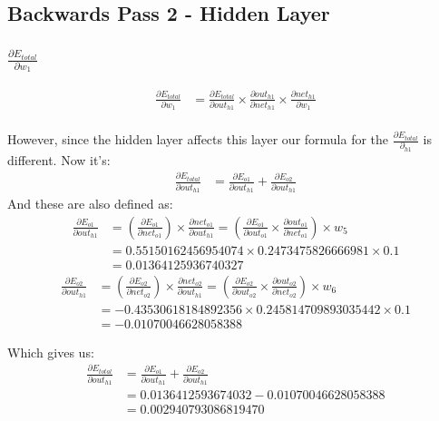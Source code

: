 \documentclass{article}
\begin{document}
\subsection{Backwards Pass 2 - Hidden Layer}
\subsubsection{$\frac{\partial E_{total}}{\partial w_1}$}
\begin{align*} \frac{\partial E_{total}}{\partial w_1} & =
    \frac{\partial E_{total}}{\partial out_{h1}} \times
    \frac{\partial out_{h1}}{\partial net_{h1}} \times
    \frac{\partial net_{h1}}{\partial w_1}
\end{align*}
\\
However, since the hidden layer affects this layer our formula for the $
    \frac{\partial E_{total}}{\partial_{h1}}
$ is different. Now it's:
\begin{align*}
    \frac{\partial E_{total}}{\partial out_{h1}} & = 
    \frac{\partial E_{o1}}{\partial out_{h1}} +
    \frac{\partial E_{o2}}{\partial out_{h1}}
\end{align*}
And these are also defined as:
\begin{align*}
    \frac{\partial E_{o1}}{\partial out_{h1}} & =
    (\frac{\partial E_{o1}}{\partial net_{o1}}) \times
    \frac{\partial net_{o1}}{\partial out_{h1}}
    = (\frac{\partial E_{o1}}{\partial out_{o1}} \times
        \frac{\partial out_{o1}}{\partial net_{o1}} ) \times w_5 \\
    & = 0.55150162456954074 \times 0.2473475826666981 \times 0.1 \\
    & = 0.01364125936740327
\end{align*}
\begin{align*}
    \frac{\partial E_{o2}}{\partial out_{h1}} & =
    (\frac{\partial E_{o2}}{\partial net_{o2}}) \times
    \frac{\partial net_{o2}}{\partial out_{h1}} 
    = (\frac{\partial E_{o2}}{\partial out_{o2}} \times
        \frac{\partial out_{o2}}{\partial net_{o2}} ) \times w_6 \\
    &= -0.43530618184892356 \times 0.245814709893035442 \times 0.1 \\
    & = -0.01070046628058388
\end{align*}

Which gives us:
\begin{align*}
    \frac{\partial E_{total}}{\partial out_{h1}} & = 
    \frac{\partial E_{o1}}{\partial out_{h1}} +
    \frac{\partial E_{o2}}{\partial out_{h1}} \\
    & = 0.0136412593674032 - 0.01070046628058388 \\
    & = 0.002940793086819470
\end{align*}
\end{document}
